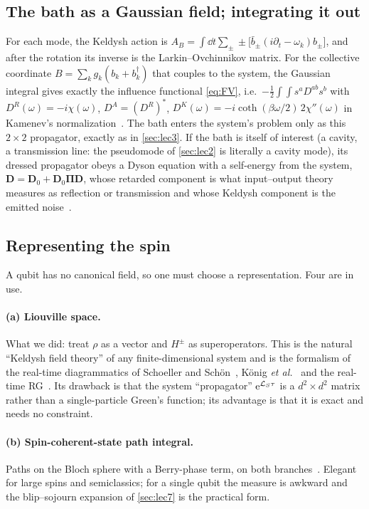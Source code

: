 \subsection{The bath as a Gaussian field; integrating it out}

For each mode, the Keldysh action is $A_B=\int\dd t\sum_\pm\pm\big[\bar b_\pm(i\partial_t-\omega_k)b_\pm\big]$, and after the rotation its inverse is the Larkin--Ovchinnikov matrix.
For the collective coordinate $B=\sum_kg_k(b_k+b_k^\dagger)$ that couples to the system, the Gaussian integral gives exactly the influence functional \eqref{eq:FV}, i.e.\ $-\frac12\int\!\!\int s^aD^{ab}s^b$ with $D^{R}(\omega)=-i\chi(\omega)$, $D^A=(D^R)^*$, $D^K(\omega)=-i\coth(\beta\omega/2)\,2\chi''(\omega)$ in Kamenev's normalization~\cite[Secs.~2.5--2.7 and 3.2]{Kamenev2011}.
The bath enters the system's problem only as this $2\times2$ propagator, exactly as in \cref{sec:lec3}.
If the bath is itself of interest (a cavity, a transmission line: the pseudomode of \cref{sec:lec2} is literally a cavity mode), its dressed propagator obeys a Dyson equation with a self-energy from the system, $\mathbf D=\mathbf D_0+\mathbf D_0\mathbf\Pi\mathbf D$, whose retarded component is what input--output theory measures as reflection or transmission and whose Keldysh component is the emitted noise~\cite{ClerkRMP2010}.

\subsection{Representing the spin}

A qubit has no canonical field, so one must choose a representation.
Four are in use.

\paragraph{(a) Liouville space.}
What we did: treat $\rho$ as a vector and $H^\pm$ as superoperators.
This is the natural ``Keldysh field theory'' of any finite-dimensional system and is the formalism of the real-time diagrammatics of Schoeller and Sch\"on~\cite{SchoellerSchon1994}, K\"onig \emph{et al.}~\cite{Konig1996} and the real-time RG~\cite{Schoeller2009,Keil2001}.
Its drawback is that the system ``propagator'' $\mathrm{e}^{\mathcal{L}_S\tau}$ is a $d^2\times d^2$ matrix rather than a single-particle Green's function; its advantage is that it is exact and needs no constraint.

\paragraph{(b) Spin-coherent-state path integral.}
Paths on the Bloch sphere with a Berry-phase term, on both branches~\cite[Ch.~4]{Altland2010}.
Elegant for large spins and semiclassics; for a single qubit the measure is awkward and the blip--sojourn expansion of \cref{sec:lec7} is the practical form.

